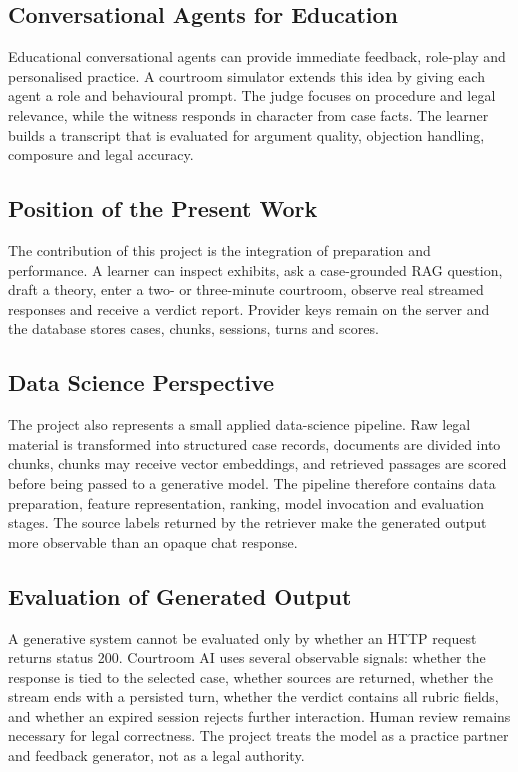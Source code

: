 \documentclass[12pt]{article}
\newcounter{procedure}
\begin{document}
\subsection{Conversational Agents for Education}
Educational conversational agents can provide immediate feedback, role-play and personalised practice. A courtroom simulator extends this idea by giving each agent a role and behavioural prompt. The judge focuses on procedure and legal relevance, while the witness responds in character from case facts. The learner builds a transcript that is evaluated for argument quality, objection handling, composure and legal accuracy.

\subsection{Position of the Present Work}
The contribution of this project is the integration of preparation and performance. A learner can inspect exhibits, ask a case-grounded RAG question, draft a theory, enter a two- or three-minute courtroom, observe real streamed responses and receive a verdict report. Provider keys remain on the server and the database stores cases, chunks, sessions, turns and scores.


\subsection{Data Science Perspective}
The project also represents a small applied data-science pipeline. Raw legal material is transformed into structured case records, documents are divided into chunks, chunks may receive vector embeddings, and retrieved passages are scored before being passed to a generative model. The pipeline therefore contains data preparation, feature representation, ranking, model invocation and evaluation stages. The source labels returned by the retriever make the generated output more observable than an opaque chat response.

\subsection{Evaluation of Generated Output}
A generative system cannot be evaluated only by whether an HTTP request returns status 200. Courtroom AI uses several observable signals: whether the response is tied to the selected case, whether sources are returned, whether the stream ends with a persisted turn, whether the verdict contains all rubric fields, and whether an expired session rejects further interaction. Human review remains necessary for legal correctness. The project treats the model as a practice partner and feedback generator, not as a legal authority.
\end{document}
